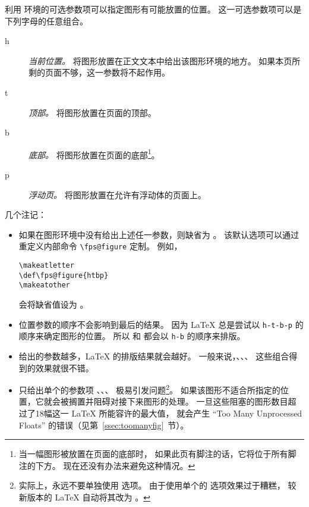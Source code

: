利用  环境的可选参数项可以指定图形有可能放置的位置。
这一可选参数项可以是下列字母的任意组合。
\begin{description}
	\item [h] \emph{当前位置。} 
	将图形放置在正文文本中给出该图形环境的地方。
	如果本页所剩的页面不够，这一参数将不起作用。
	\item [t] \emph{顶部。} 将图形放置在页面的顶部。
	\item [b] \emph{底部。} 将图形放置在页面的底部\footnote{
        当一幅图形被放置在页面的底部时，
		如果此页有脚注的话，它将位于所有脚注的下方。
		现在还没有办法来避免这种情况。}。
	\item [p] \emph{浮动页。} 将图形放置在允许有浮动体的页面上。
\end{description}

几个注记：
\begin{itemize}
	\item 如果在图形环境中没有给出上述任一参数，则缺省为 \opt{[tbp]}。
	该默认选项可以通过重定义内部命令 \verb|\fps@figure| 定制。
	例如，
\begin{lstlisting}
\makeatletter
\def\fps@figure{htbp}
\makeatother
\end{lstlisting}
	会将缺省值设为 \opt{[htbp]}。
	
	\item 位置参数的顺序不会影响到最后的结果。
	因为 \LaTeX{} 总是尝试以 \texttt{h-t-b-p} 的顺序来确定图形的位置。
	所以 \opt{[hb]} 和 \opt{[bh]} 都会以 \texttt{h-b}	的顺序来排版。
	
	\item 给出的参数越多，\LaTeX{} 的排版结果就会越好。
	一般来说，\opt{[htbp]}、\opt{[tbp]}、\opt{[htp]}、\opt{[tp]} 这些组合得到的效果就很不错。
	
	\item 只给出单个的参数项 \opt{[t]}、\opt{[b]}、\opt{[p]}、\opt{[h]} 极易引发问题\footnote{
        实际上，永远不要单独使用 \opt{[h]} 选项。
		由于使用单个的 \opt{[h]} 选项效果过于糟糕，
		较新版本的 \LaTeX{} 自动将其改为 \opt{[ht]}。}。
	如果该图形不适合所指定的位置，它就会被搁置并阻碍对接下来图形的处理。
	一旦这些阻塞的图形数目超过了18幅这一 \LaTeX{} 所能容许的最大值，
	就会产生 ``Too Many Unprocessed Floats'' 的错误（见第~\ref{ssec:toomanyfig}~节）。
\end{itemize}

